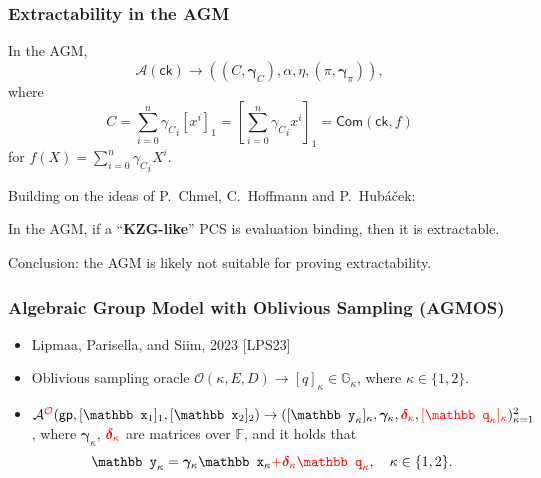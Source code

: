 \documentclass[9pt]{beamer}
\newcommand{\red}[1]{\textcolor{red!}{#1}}
\newcommand{\F}{\mathbb{F}}
\newcommand{\G}{\mathbb{G}}
\newcommand{\Com}{\mathsf{Com}}
\newcommand{\ck}{\mathsf{ck}}  %
\newcommand{\A}{\mathcal A}  %
\newcommand{\gp}{\mathsf{gp}}  %
\newcommand{\Oracle}{\mathcal{O}}  %
\begin{document}
\begin{frame}
\frametitle{Extractability in the AGM}
In the AGM,
\[
\A(\ck) \to ((C, \bm \gamma_C), \alpha, \eta, (\pi, \bm \gamma_\pi)),
\]
where 
\[
C = \sum_{i=0}^n {\gamma_C}_i [x^i]_1 = 
\left[ \sum_{i=0}^n {\gamma_C}_i x^i \right]_1 = 
\Com(\ck, f)
\]
for $ f(X) = \sum_{i=0}^n {\gamma_C}_i X^i $.

Building on the ideas of P.\ Chmel, C.\ Hoffmann and P.\ Hubáček:
\begin{theorem}[informal]
In the AGM, if a ``\textbf{KZG-like}'' PCS is evaluation binding, then it is extractable.
\end{theorem}
Conclusion: the AGM is likely not suitable for proving extractability. 
\end{frame}


\begin{frame}
\frametitle{Algebraic Group Model with Oblivious Sampling (AGMOS)}
\begin{itemize}
    \item Lipmaa, Parisella, and Siim, 2023 [LPS23]
    \item Oblivious sampling oracle $ \Oracle(\kappa, E, D) \to [q]_\kappa \in \G_\kappa $, where $ \kappa \in \{ 1, 2 \} $.
    \item \(
    \A^{\red{\Oracle}}(\gp, [\mathbb x_1]_1, [\mathbb x_2]_2) \to
    ([\mathbb y_\kappa]_\kappa, \bm \gamma_\kappa, \red{\bm \delta_\kappa}, \red{[\mathbb q_\kappa]_\kappa})_{\kappa=1}^2
    \), where $ \bm{\gamma}_\kappa $, $ \red{\bm{\delta}_\kappa} $ are matrices over $ \F $, and it holds that 
    \begin{equation*}
    \mathbb y_\kappa = \bm{\gamma}_\kappa \mathbb x_\kappa \red{+ \bm \delta_\kappa \mathbb q_\kappa}, \quad 
    \kappa \in \{ 1, 2 \}.
    \end{equation*}
\end{itemize}   
\end{frame}
\end{document}
